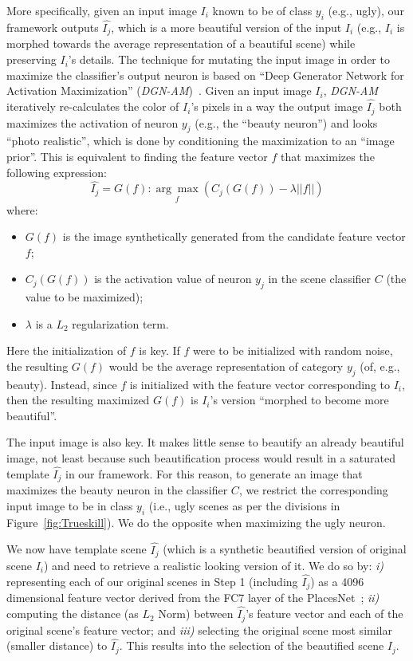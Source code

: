 More specifically, given an input image $I_i$ known to be of class $y_i$  (e.g., ugly), our framework outputs  $\hat{I_j}$, which is a more beautiful version of the input $I_i$ (e.g., $I_i$ is morphed  towards the average representation of a beautiful scene) while preserving $I_i$'s details. The technique for mutating the input image in order to maximize the classifier's output neuron is based on ``Deep Generator Network for Activation Maximization'' (\emph{DGN-AM})~\cite{nguyen2016synthesizing}. Given an input image $I_i$, \emph{DGN-AM} iteratively re-calculates the color of $I_i$'s pixels in  a way  the output image $\hat{I_j}$  both maximizes  the  activation of neuron $y_j$ (e.g., the ``beauty neuron'') and looks ``photo realistic'',  which is done by conditioning the maximization to an ``image prior''. This is equivalent to finding the feature vector $f$ that maximizes the following expression:
\begin{equation}
\hat{I_j} =G( f ) : \underset{f}{\arg\max}(C_{j}(G(f))-\lambda||f||)
\end{equation}
where:
\begin{itemize}
    \item $G(f)$ is the image synthetically generated from the candidate feature vector $f$;
    \item $C_j(G(f))$ is the activation value of neuron $y_j$ in the scene classifier $C$ (the value to be maximized);
    \item $\lambda$ is a $L_2$ regularization term.
\end{itemize}
Here the initialization of $f$ is key. If $f$ were to be initialized with random noise, the resulting $G(f)$ would be the average representation of category $y_j$ (of, e.g., beauty). Instead, since $f$ is initialized with the feature vector corresponding to $I_i$, then the resulting maximized $G(f)$ is $I_i$'s version ``morphed to become more beautiful''.

The input image is also key. It makes little sense to beautify an already beautiful image, not least because such beautification process would result in a saturated template $\hat{I_j}$ in our framework. For this reason, to generate an image that maximizes the beauty neuron in the classifier $C$, we restrict the  corresponding input image to be in class $y_i$ (i.e., ugly scenes as per the divisions in Figure~\ref{fig:Trueskill}). We do the opposite when maximizing the ugly neuron. 

We now have template scene $\hat{I_j}$ (which is a synthetic beautified version of original scene $I_i$) and need to retrieve a realistic looking version of it. We do so by: \emph{i)} representing each of our original scenes in Step 1 (including $\hat{I_j}$) as a 4096 dimensional feature vector derived from the FC7 layer of the PlacesNet~\cite{zhou2014learning}; \emph{ii)} computing the distance (as $L_2$ Norm) between $\hat{I_j}$'s feature vector and each of the original scene's feature vector; and \emph{iii)} selecting the original scene most similar (smaller distance) to $\hat{I_j}$. This results into the selection of the beautified scene $I_j$.


